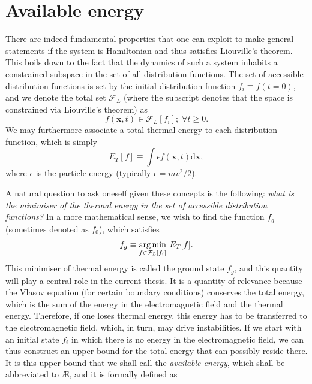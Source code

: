 \section{Available energy}
There are indeed fundamental properties that one can exploit to make general statements if the system is Hamiltonian and thus satisfies Liouville's theorem. This boils down to the fact that the dynamics of such a system inhabits a constrained subspace in the set of all distribution functions. The set of accessible distribution functions is set by the initial distribution function $f_i \equiv f(t=0)$, and we denote the total set $\mathcal{F}_L$ (where the subscript denotes that the space is constrained via Liouville's theorem) as
\begin{equation}
    f(\boldsymbol{x},t) \in \mathcal{F}_L [f_i]; \; \forall t \geq 0.
    \label{eq:set-of-all-distribution-functions}
\end{equation}
We may furthermore associate a total thermal energy to each distribution function, which is simply
\begin{equation}
    E_T[f] \equiv \int \epsilon f(\boldsymbol{x},t) \mathrm{d} \boldsymbol{x},
\end{equation}
where $\epsilon$ is the particle energy (typically $\epsilon=mv^2/2$).\par 
A natural question to ask oneself given these concepts is the following: \textit{what is the minimiser of the thermal energy in the set of accessible distribution functions?} In a more mathematical sense, we wish to find the function $f_g$ (sometimes denoted as $f_0$), which satisfies
\begin{equation}
    f_g \equiv \operatorname*{arg\,min}_{f \in \mathcal{F}_L[f_i]} \:  E_T[f].
\end{equation}
This minimiser of thermal energy is called the ground state $f_g$, and this quantity will play a central role in the current thesis. It is a quantity of relevance because the Vlasov equation (for certain boundary conditions) conserves the total energy, which is the sum of the energy in the electromagnetic field and the thermal energy. Therefore, if one loses thermal energy, this energy has to be transferred to the electromagnetic field, which, in turn, may drive instabilities. If we start with an initial state $f_i$ in which there is no energy in the electromagnetic field, we can thus construct an upper bound for the total energy that can possibly reside there. It is this upper bound that we shall call the \textit{available energy}, which shall be abbreviated to \AE{}, and it is formally defined as
